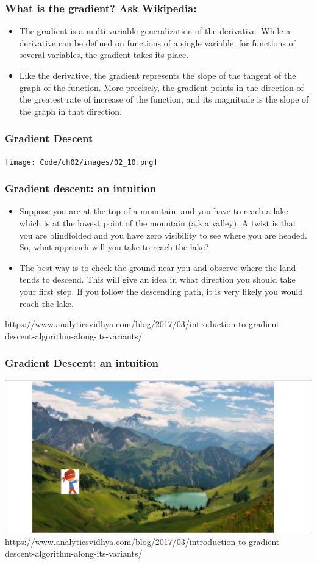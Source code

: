 \documentclass{beamer}
\begin{document}
\begin{frame}
\frametitle{What is the gradient? Ask Wikipedia:}
\begin{itemize}
\item The gradient is a multi-variable generalization of the derivative. While a derivative can be defined on functions of a single variable, for functions of several variables, the gradient takes its place.
\item Like the derivative, the gradient represents the slope of the tangent of the graph of the function. More precisely, the gradient points in the direction of the greatest rate of increase of the function, and its magnitude is the slope of the graph in that direction.
\end{itemize}
\end{frame}

\begin{frame}
  \frametitle{Gradient Descent}
  \texttt{[image: Code/ch02/images/02\_10.png]}
\end{frame}

\begin{frame}
  \frametitle{Gradient descent: an intuition}
  \begin{itemize}
  \item Suppose you are at the top of a mountain, and you have to reach a lake which is at the lowest point of the mountain (a.k.a valley). A twist is that you are blindfolded and you have zero visibility to see where you are headed. So, what approach will you take to reach the lake?
  \item The best way is to check the ground near you and observe where the land tends to descend. This will give an idea in what direction you should take your first step. If you follow the descending path, it is very likely you would reach the lake.
  \end{itemize}
  \vspace{0.2in}
  \tiny
  https://www.analyticsvidhya.com/blog/2017/03/introduction-to-gradient-descent-algorithm-along-its-variants/
\end{frame}

\begin{frame}
  \frametitle{Gradient Descent: an intuition}
  \center
  \includegraphics[scale=0.40]{Images/grad_desc1.png}
  \tiny
  \vspace{0.2in}
  https://www.analyticsvidhya.com/blog/2017/03/introduction-to-gradient-descent-algorithm-along-its-variants/
\end{frame}
\end{document}
